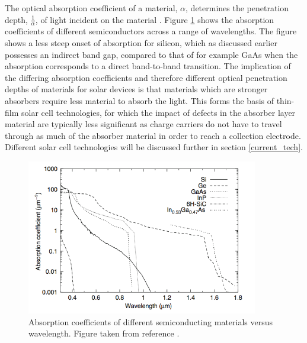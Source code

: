 The optical absorption coefficient of a material, $\alpha$, determines the penetration depth, $\frac{1}{\alpha}$, of light incident on the material \cite{absorption_coeff_book1}. Figure \ref{absorption_fig} shows the absorption coefficients of different semiconductors across a range of wavelengths. The figure shows a less steep onset of absorption for silicon, which as discussed earlier possesses an indirect band gap, compared to that of for example GaAs when the absorption corresponds to a direct band-to-band transition. The implication of the differing absorption coefficients and therefore different optical penetration depths of materials for solar devices is that materials which are stronger absorbers require less material to absorb the light. This forms the basis of thin-film solar cell technologies, for which the impact of defects in the absorber layer material are typically less significant as charge carriers do not have to travel through as much of the absorber material in order to reach a collection electrode. Different solar cell technologies will be discussed further in section \ref{current_tech}.

\begin{figure}[h!]
  \centering
    \includegraphics[width=0.9\textwidth]{figures/absorption_fig.png}
    \caption{Absorption coefficients of different semiconducting materials versus wavelength. Figure taken from reference .}
  \label{absorption_fig}
\end{figure}

